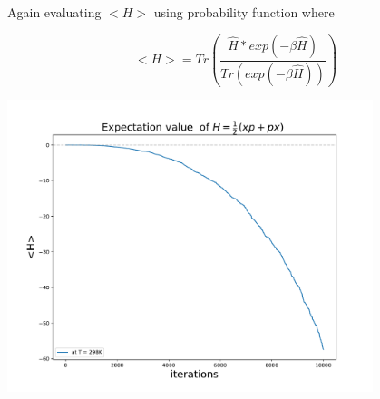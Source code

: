 \documentclass[12pt, letterpaper]{article}
\begin{document}
        Again evaluating $<H>$ using probability function where

        \begin{equation}
            <H> = Tr (\frac{\hat{H}*exp(-\beta \hat{H})}{Tr (exp(-\beta \hat{H} ))})
        \end{equation}
        \begin{adjustbox}{center,caption={Graph of Expectation value of Berry-Keating},nofloat=figure,label={somelabel}}
            \includegraphics[width=0.8\textwidth]{beta.pdf}
        \end{adjustbox}
\end{document}
